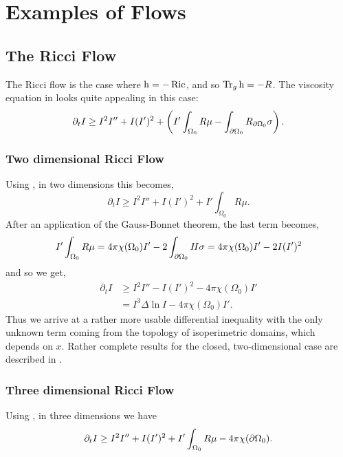 \documentclass{amsart}
\begin{document}
\section{Examples of Flows}
\label{sec:flows}

\subsection{The Ricci Flow}
\label{subsec:flows_ricci}

The Ricci flow is the case where $\operatorname{h} = -\operatorname{Ric}$, and so $\operatorname{Tr}_g \operatorname{h} = -R$. The viscosity equation in  looks quite appealing in this case:
\begin{equation}
\label{eq:viscosity_ricciflow}
\partial_t I \geq I^2I'' + I(I')^2 + \left(I'\int_{\Omega_0} R \mu - \int_{\partial {\Omega_0}} R_{\partial {\Omega_0}}\sigma \right).
\end{equation}

\subsubsection*{Two dimensional Ricci Flow}

Using , in two dimensions this becomes,
\[
\partial_t I \geq I^2I'' + I(I')^2 + I'\int_{\Omega_0} R \mu.
\]
After an application of the Gauss-Bonnet theorem, the last term becomes,
\[
I'\int_{\Omega_0} R \mu = 4\pi\chi(\Omega_0)I' - 2\int_{\partial {\Omega_0}} H \sigma = 4\pi\chi(\Omega_0)I'- 2 I (I')^2
\]
and so we get,
\begin{equation}
\label{eq:2d_viscosity_ricciflow}
\begin{split}
\partial_t I &\geq I^2I'' - I(I')^2 - 4\pi\chi(\Omega_0)I' \\
&= I^3 \Delta \ln I - 4\pi\chi(\Omega_0)I'.
\end{split}
\end{equation}
Thus we arrive at a rather more usable differential inequality with the only unknown term coming from the topology of isoperimetric domains, which depends on \(x\). Rather complete results for the closed, two-dimensional case are described in \cite{Bryan:/2016,AndrewsBryan:/2010}.

\subsubsection*{Three dimensional Ricci Flow}

Using , in three dimensions we have
\begin{equation}
\label{eq:3d_viscosity_ricciflow}
\partial_t I \geq I^2I'' + I(I')^2 + I'\int_{\Omega_0} R \mu - 4\pi\chi(\partial {\Omega_0}).
\end{equation}
\end{document}
